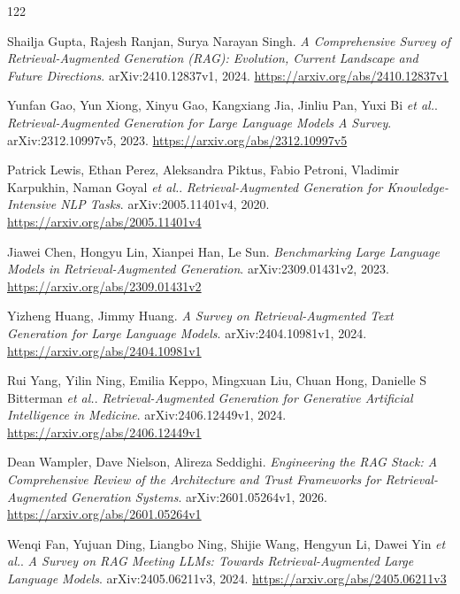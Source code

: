 \documentclass[11pt,a4paper]{article}
\begin{document}
\begin{thebibliography}{122}
\setlength{\itemsep}{2pt}

Shailja Gupta, Rajesh Ranjan, Surya Narayan Singh.
\newblock \emph{A Comprehensive Survey of Retrieval-Augmented Generation (RAG): Evolution, Current Landscape and Future Directions}.
\newblock arXiv:2410.12837v1, 2024.
\newblock \url{https://arxiv.org/abs/2410.12837v1}

Yunfan Gao, Yun Xiong, Xinyu Gao, Kangxiang Jia, Jinliu Pan, Yuxi Bi \emph{et al.}.
\newblock \emph{Retrieval-Augmented Generation for Large Language Models A Survey}.
\newblock arXiv:2312.10997v5, 2023.
\newblock \url{https://arxiv.org/abs/2312.10997v5}

Patrick Lewis, Ethan Perez, Aleksandra Piktus, Fabio Petroni, Vladimir Karpukhin, Naman Goyal \emph{et al.}.
\newblock \emph{Retrieval-Augmented Generation for Knowledge-Intensive NLP Tasks}.
\newblock arXiv:2005.11401v4, 2020.
\newblock \url{https://arxiv.org/abs/2005.11401v4}

Jiawei Chen, Hongyu Lin, Xianpei Han, Le Sun.
\newblock \emph{Benchmarking Large Language Models in Retrieval-Augmented Generation}.
\newblock arXiv:2309.01431v2, 2023.
\newblock \url{https://arxiv.org/abs/2309.01431v2}

Yizheng Huang, Jimmy Huang.
\newblock \emph{A Survey on Retrieval-Augmented Text Generation for Large Language Models}.
\newblock arXiv:2404.10981v1, 2024.
\newblock \url{https://arxiv.org/abs/2404.10981v1}

Rui Yang, Yilin Ning, Emilia Keppo, Mingxuan Liu, Chuan Hong, Danielle S Bitterman \emph{et al.}.
\newblock \emph{Retrieval-Augmented Generation for Generative Artificial Intelligence in Medicine}.
\newblock arXiv:2406.12449v1, 2024.
\newblock \url{https://arxiv.org/abs/2406.12449v1}

Dean Wampler, Dave Nielson, Alireza Seddighi.
\newblock \emph{Engineering the RAG Stack: A Comprehensive Review of the Architecture and Trust Frameworks for Retrieval-Augmented Generation Systems}.
\newblock arXiv:2601.05264v1, 2026.
\newblock \url{https://arxiv.org/abs/2601.05264v1}

Wenqi Fan, Yujuan Ding, Liangbo Ning, Shijie Wang, Hengyun Li, Dawei Yin \emph{et al.}.
\newblock \emph{A Survey on RAG Meeting LLMs: Towards Retrieval-Augmented Large Language Models}.
\newblock arXiv:2405.06211v3, 2024.
\newblock \url{https://arxiv.org/abs/2405.06211v3}


\end{thebibliography}
\end{document}
